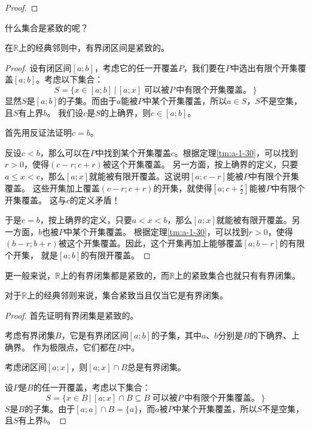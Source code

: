 \documentclass[12pt,UTF8,fontset=none]{ctexbook}
\begin{document}
\begin{appendix}
\begin{proof}
\end{proof}

什么集合是紧致的呢？

\begin{tm}\label{tm:a-3-10}
    在$\mathbb{R}$上的经典邻则中，有界闭区间是紧致的。
\end{tm}

\begin{proof}
    设有闭区间$[a;b]$，考虑它的任一开覆盖$P$，我们要在$P$中选出有限个开集覆盖$[a;b]$。考虑以下集合：
    $$ S = \{ x\in[a;b] \, | \, [a;x] \; \mbox{可以被}P\,\mbox{中有限个开集覆盖。} \, \} $$
    显然$S$是$[a;b]$的子集。而由于$a$能被$P$中某个开集覆盖，所以$a\in S$，$S$不是空集，且$S$有上界$b$。
    我们设$c$是$S$的上确界，则$c\in[a;b]$。

    首先用反证法证明$c=b$。

    反设$c < b$，那么可以在$P$中找到某个开集覆盖$c$。根据定理\ref{tm:a-1-30}，可以找到$r>0$，使得$(c-r;c+r)$被这个开集覆盖。
    另一方面，按上确界的定义，只要$a\leqslant x<c$，那么$[a;x]$就能被有限开覆盖。这说明$[a;c-r]$能被$P$中有限个开集覆盖。
    这些开集加上覆盖$(c-r;c+r)$的开集，就使得$\displaystyle\left[a;c+\frac{r}{2}\right]$能被$P$中有限个开集覆盖。
    这与$c$的定义矛盾！

    于是$c=b$，按上确界的定义，只要$a<x<b$，那么$[a;x]$就能被有限开覆盖。另一方面，$b$也被$P$中某个开集覆盖。
    根据定理\ref{tm:a-1-30}，可以找到$r>0$，使得$(b-r;b+r)$被这个开集覆盖。因此，这个开集再加上能够覆盖$[a;b-r]$的有限个开集，
    就是$[a;b]$的有限开覆盖。

\end{proof}

更一般来说，$\mathbb{R}$上的有界闭集都是紧致的，而$\mathbb{R}$上的紧致集合也就只有有界闭集。

\begin{tm}
    对于$\mathbb{R}$上的经典邻则来说，集合紧致当且仅当它是有界闭集。
\end{tm}

\begin{proof}
    首先证明有界闭集是紧致的。
    
    考虑有界闭集$B$，它是有界闭区间$[a;b]$的子集，其中$a$、$b$分别是$B$的下确界、上确界。
    作为极限点，它们都在$B$中。
    
    考虑闭区间$[a;x]$，则$[a;x]\cap B$总是有界闭集。
    
    设$P$是$B$的任一开覆盖，考虑以下集合：
    $$ S = \{ x\in B \, | \, [a;x]\cap B \subseteq B \; \mbox{可以被}P\,\mbox{中有限个开集覆盖。} \, \} $$
    $S$是$B$的子集。由于$[a;a]\cap B = \{a\}$，而$a$被$P$中某个开集覆盖，所以$S$不是空集，且$S$有上界$b$。
    

\end{proof}
\end{appendix}
\end{document}
